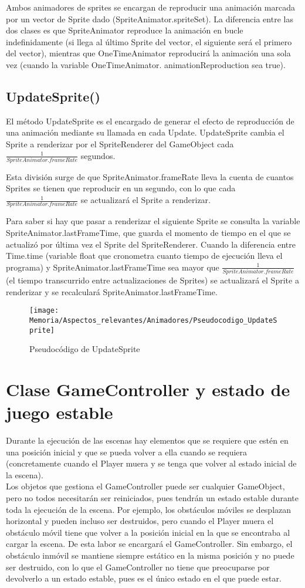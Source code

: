 Ambos animadores de sprites se encargan de reproducir una animación marcada por un vector de Sprite dado (SpriteAnimator.spriteSet). La diferencia entre las dos clases es que SpriteAnimator reproduce la animación en bucle indefinidamente (si llega al último Sprite del vector, el siguiente será el primero del vector), mientras que OneTimeAnimator reproducirá la animación una sola vez (cuando la variable OneTimeAnimator. animationReproduction sea true).

\subsection{UpdateSprite()}
El método UpdateSprite es el encargado de generar el efecto de reproducción de una animación mediante su llamada en cada Update. UpdateSprite cambia el Sprite a renderizar por el SpriteRenderer del GameObject cada $\frac{1}{SpriteAnimator.frameRate}$ segundos.

 
Esta división surge de que SpriteAnimator.frameRate lleva la cuenta de cuantos Sprites se tienen que reproducir en un segundo, con lo que cada $\frac{1}{SpriteAnimator.frameRate}$ se actualizará el Sprite a renderizar.

Para saber si hay que pasar a renderizar el siguiente Sprite se consulta la variable SpriteAnimator.lastFrameTime, que guarda el momento de tiempo en el que se actualizó por última vez el Sprite del SpriteRenderer. Cuando la diferencia entre Time.time (variable float que cronometra cuanto tiempo de ejecución lleva el programa) y SpriteAnimator.lastFrameTime sea mayor que $\frac{1}{SpriteAnimator.frameRate}$ (el tiempo transcurrido entre actualizaciones de Sprites) se actualizará el Sprite a renderizar y se recalculará SpriteAnimator.lastFrameTime.

\begin{figure}[h]
\texttt{[image: Memoria/Aspectos\_relevantes/Animadores/Pseudocodigo\_UpdateSprite]}
\caption{Pseudocódigo de UpdateSprite}
\end{figure}

\section{Clase GameController y estado de juego estable}
Durante la ejecución de las escenas hay elementos que se requiere que estén en una posición inicial y que se pueda volver a ella cuando se requiera (concretamente cuando el Player muera y se tenga que volver al estado inicial de la escena).\\
Los objetos que gestiona el GameController puede ser cualquier GameObject, pero no todos necesitarán ser reiniciados, pues tendrán un estado estable durante toda la ejecución de la escena. Por ejemplo, los obstáculos móviles se desplazan horizontal y pueden incluso ser destruidos, pero cuando el Player muera el obstáculo móvil tiene que volver a la posición inicial en la que se encontraba al cargar la escena. De esta labor se encargará el GameController. Sin embargo, el obstáculo inmóvil se mantiene siempre estático en la misma posición y no puede ser destruido, con lo que el GameController no tiene que preocuparse por devolverlo a un estado estable, pues es el único estado en el que puede estar.

